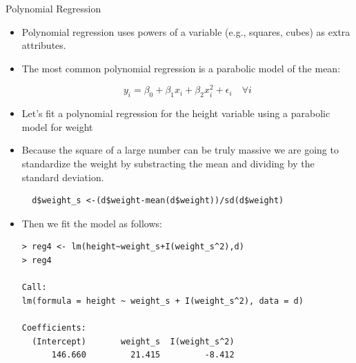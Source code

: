 \documentclass[handout]{beamer}
\begin{document}
\begin{frame}[fragile]{Polynomial Regression}
\scriptsize{ 
\begin{itemize}
 \item Polynomial regression uses powers of a variable (e.g., squares, cubes) as extra attributes.
 
 \item The most common polynomial regression is a parabolic model of the mean:
 
 \begin{displaymath}
 y_i=\beta_{0}+\beta_{1}x_i + \beta_{2}x_i^2 + \epsilon_i \quad \forall i
\end{displaymath}
 
 \item Let's fit a polynomial regression for the height variable using a parabolic model for weight
 
 
 \item Because the square of a large number can be truly massive we are going to standardize the weight by substracting the mean and dividing by the standard deviation.
 
 \begin{verbatim}
  d$weight_s <-(d$weight-mean(d$weight))/sd(d$weight)
 \end{verbatim}

\item Then we fit the model as follows:
\begin{verbatim}
> reg4 <- lm(height~weight_s+I(weight_s^2),d) 
> reg4

Call:
lm(formula = height ~ weight_s + I(weight_s^2), data = d)

Coefficients:
  (Intercept)       weight_s  I(weight_s^2)  
      146.660         21.415         -8.412
\end{verbatim}

 
 
\end{itemize}


}
\end{frame}
\end{document}
